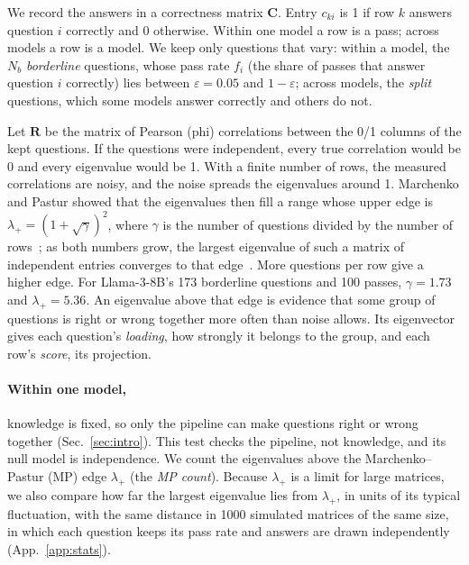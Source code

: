 \documentclass{article}
\theoremstyle{plain}
\theoremstyle{remark}
\begin{document}
We record the answers in a correctness matrix $\mathbf{C}$. Entry
$c_{ki}$ is 1 if row $k$ answers question $i$ correctly and 0 otherwise.
Within one model a row is a pass; across models a row is a model. We keep
only questions that vary: within a model, the $N_b$ \emph{borderline}
questions, whose pass rate $f_i$ (the share of passes that answer
question $i$ correctly) lies between $\varepsilon=0.05$ and
$1-\varepsilon$; across models, the \emph{split} questions, which some 
models answer correctly and others do not.

Let $\mathbf{R}$ be the matrix of Pearson (phi) correlations between the
0/1 columns of the kept questions. If the
questions were independent, every true correlation would be 0 and every
eigenvalue would be 1. With a finite number of rows, the measured
correlations are noisy, and the noise spreads the eigenvalues around 1.
Marchenko and Pastur showed that the eigenvalues then fill a range
whose upper edge is $\lambda_+=(1+\sqrt\gamma)^2$, where $\gamma$ is the
number of questions divided by the number of
rows~\citep{marchenkopastur1967}; as both numbers grow, the largest
eigenvalue of such a matrix of independent entries converges to that
edge~\citep{baisilverstein2010,jiang2004correlation}. More questions per
row give a higher edge. For
Llama-3-8B's 173 borderline questions and 100 passes, $\gamma=1.73$ and
$\lambda_+=5.36$. An eigenvalue above that edge is evidence that some group of questions
is right or wrong together more often than noise allows. Its eigenvector gives each question's
\emph{loading}, how strongly it belongs to the group, and each
row's \emph{score}, its projection.

\paragraph{Within one model,} knowledge is fixed, so only the pipeline
can make questions right or wrong together (Sec.~\ref{sec:intro}). This
test checks the pipeline, not
knowledge, and its null model is independence. We count the eigenvalues
above the Marchenko--Pastur (MP) edge $\lambda_+$ (the \emph{MP count}). Because $\lambda_+$ is a limit
for large matrices, we also compare how far the largest eigenvalue lies
from $\lambda_+$, in units of its typical fluctuation, with the same
distance in 1000 simulated matrices of the same size, in which each
question keeps its pass rate and answers are drawn independently
(App.~\ref{app:stats}).
\end{document}
